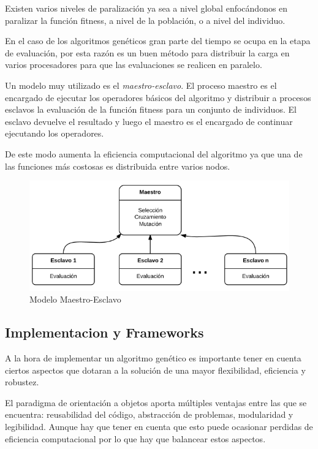 Existen varios niveles de paralización ya sea a nivel global enfocándonos en paralizar la función fitness, a nivel de la población, o a nivel del individuo. \citep{Nesmachnow2002}

En el caso de los algoritmos genéticos gran parte del tiempo se ocupa en la etapa de evaluación, por esta razón es un buen método para distribuir la carga en varios procesadores para que las evaluaciones se realicen en paralelo. 

Un modelo muy utilizado es el \emph{maestro-esclavo}. El proceso maestro es el encargado de ejecutar los operadores básicos del algoritmo y distribuir a procesos esclavos la evaluación de la función fitness para un conjunto de individuos. El esclavo devuelve el resultado y luego el maestro es el encargado de continuar ejecutando los operadores.

De este modo aumenta la eficiencia computacional del algoritmo ya que una de las funciones más costosas es distribuida entre varios nodos.

\begin{figure}[H]
	\centering
	\includegraphics[width=0.9\linewidth]{Figures/diagrama-master-slave}
	\caption[Modelo Maestro-Esclavo]{Modelo Maestro-Esclavo}
	\label{fig:diagrama-master-slave}
\end{figure}

\subsection{Implementacion y Frameworks}

A la hora de implementar un algoritmo genético es importante tener en cuenta ciertos aspectos que dotaran a la solución de una mayor flexibilidad, eficiencia y robustez.

El paradigma de orientación a objetos aporta múltiples ventajas entre las que se encuentra: reusabilidad del código, abstracción de problemas, modularidad y legibilidad. Aunque hay que tener en cuenta que esto puede ocasionar perdidas de eficiencia computacional por lo que hay que balancear estos aspectos.

